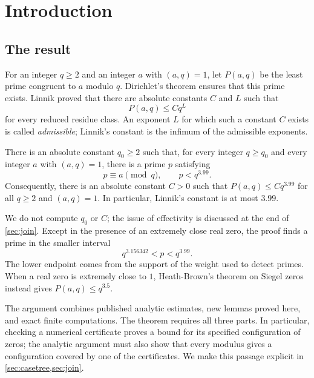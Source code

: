 \section{Introduction}\label{sec:intro}

\subsection{The result}
For an integer $q\ge2$ and an integer $a$ with $(a,q)=1$, let $P(a,q)$ be the least prime
congruent to $a$ modulo $q$. Dirichlet's theorem \cite{Dirichlet1889beweis} ensures that this
prime exists. Linnik \cite{Linnik1944least,Linnik1944deuring} proved that there are absolute
constants $C$ and $L$ such that
\begin{equation}\label{eq:linnik}
  P(a,q)\le Cq^L
\end{equation}
for every reduced residue class. An exponent $L$ for which such a constant $C$ exists is
called \emph{admissible}; Linnik's constant is the infimum of the admissible exponents.

\begin{theorem}\label{thm:main}
There is an absolute constant $q_0\ge2$ such that, for every integer $q\ge q_0$ and every
integer $a$ with $(a,q)=1$, there is a prime $p$ satisfying
\[
  p\equiv a\pmod q,\qquad p<q^{3.99}.
\]
Consequently, there is an absolute constant $C>0$ such that
$P(a,q)\le Cq^{3.99}$ for all $q\ge2$ and $(a,q)=1$. In particular, Linnik's constant is at
most $3.99$.
\end{theorem}

We do not compute $q_0$ or $C$; the issue of effectivity is discussed at the end of
\cref{sec:join}. Except in the presence of an extremely close real zero, the proof finds a
prime in the smaller interval
\[
  q^{3.156342}<p<q^{3.99}.
\]
The lower endpoint comes from the support of the weight used to detect primes. When a
real zero is extremely close to $1$, Heath-Brown's theorem on Siegel zeros
\cite{HeathBrown1990siegel} instead gives $P(a,q)\le q^{3.5}$.

The argument combines published analytic estimates, new lemmas proved here, and exact
finite computations. The theorem requires all three parts. In particular, checking a
numerical certificate proves a bound for its specified configuration of zeros; the
analytic argument must also show that every modulus gives a configuration covered by
one of the certificates. We make this passage explicit in \cref{sec:casetree,sec:join}.

